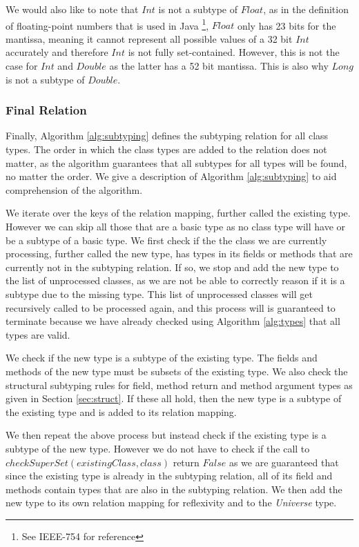 \documentclass{l4proj}
\begin{document}
We would also like to note that $Int$ is not a subtype of $Float$, as in the definition of  floating-point numbers that is used in Java \footnote{See IEEE-754 for reference}, $Float$ only has 23 bits for the mantissa, meaning it cannot represent all possible values of a 32 bit $Int$ accurately and therefore $Int$ is not fully set-contained.
However, this is not the case for $Int$ and $Double$ as the latter has a 52 bit mantissa. This is also why $Long$ is not a subtype of $Double$.

\subsubsection{Final Relation}

Finally, Algorithm \ref{alg:subtyping} defines the subtyping relation for all class types.
The order in which the class types are added to the relation does not matter, as the algorithm guarantees that all subtypes for all types will be found, no matter the order. We give a description of Algorithm \ref{alg:subtyping} to aid comprehension of the algorithm.

We iterate over the keys of the relation mapping, further called the existing type.
However we can skip all those that are a basic type as no class type will have or be a subtype of a basic type.
We first check if the the class we are currently processing, further called the new type, has types in its fields or methods that are currently not in the subtyping relation.
If so, we stop and add the new type to the list of unprocessed classes, as we are not be able to correctly reason if it is a subtype due to the missing type.
This list of unprocessed classes will get recursively called to be processed again, and this process will is guaranteed to terminate because we have already checked using Algorithm \ref{alg:types} that all types are valid.

We check if the new type is a subtype of the existing type. The fields and methods of the new type must be subsets of the existing type.
We also check the structural subtyping rules for field, method return and method argument types as given in Section \ref{sec:struct}.
If these all hold, then the new type is a subtype of the existing type and is added to its relation mapping.

We then repeat the above process but instead check if the existing type is a subtype of the new type.
However we do not have to check if the call to $checkSuperSet(existingClass, class)$ return $False$ as we are guaranteed that since the existing type is already in the subtyping relation, all of its field and methods contain types that are also in the subtyping relation.
We then add the new type to its own relation mapping for reflexivity and to the \emph{Universe} type.
\end{document}
